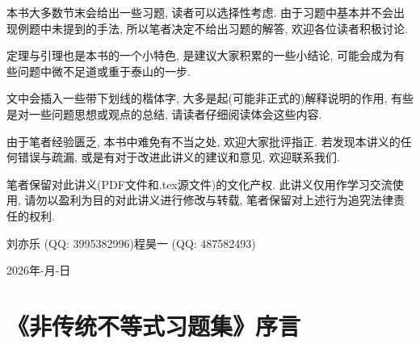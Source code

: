 \documentclass[lang=cn,12pt,thmcnt=section]{elegantbook}
\begin{document}
本书大多数节末会给出一些习题, 读者可以选择性考虑. 由于习题中基本并不会出现例题中未提到的手法, 所以笔者决定不给出习题的解答, 欢迎各位读者积极讨论. \par
定理与引理也是本书的一个小特色, 是建议大家积累的一些小结论, 可能会成为有些问题中微不足道或重于泰山的一步. \par
文中会插入一些带下划线的楷体字, 大多是起(可能非正式的)解释说明的作用, 有些是对一些问题思想或观点的总结, 请读者仔细阅读体会这些内容. \par
由于笔者经验匮乏, 本书中难免有不当之处, 欢迎大家批评指正. 若发现本讲义的任何错误与疏漏, 或是有对于改进此讲义的建议和意见, 欢迎联系我们.\par
笔者保留对此讲义(PDF文件和.tex源文件)的文化产权. 此讲义仅用作学习交流使用, 请勿以盈利为目的对此讲义进行修改与转载, 笔者保留对上述行为追究法律责任的权利.\par
\quad\par
{\hfill\kaishu 刘亦乐 (QQ: 3995382996)\quad 程昊一 (QQ: 487582493)}\par
{\hfill\kaishu 2026年-月-日}

\chapter*{《非传统不等式习题集》序言}
\end{document}
